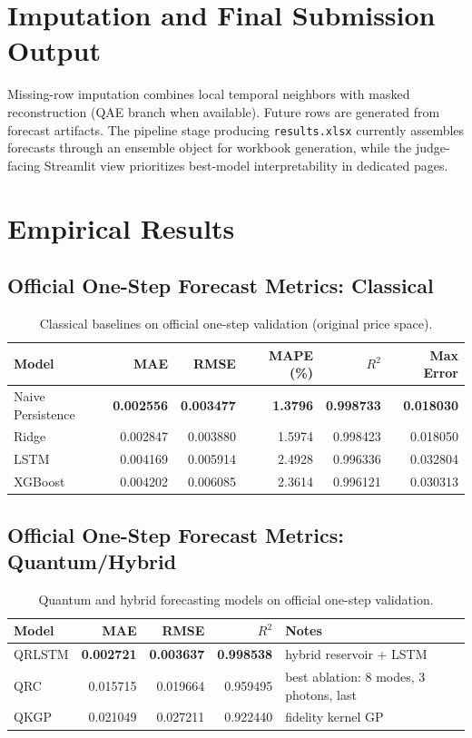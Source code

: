\documentclass[11pt]{article}
\begin{document}
\section{Imputation and Final Submission Output}
Missing-row imputation combines local temporal neighbors with masked reconstruction (QAE branch when available). Future rows are generated from forecast artifacts. The pipeline stage producing \texttt{results.xlsx} currently assembles forecasts through an ensemble object for workbook generation, while the judge-facing Streamlit view prioritizes best-model interpretability in dedicated pages.

\section{Empirical Results}
\subsection{Official One-Step Forecast Metrics: Classical}
\begin{table}[H]
\centering
\caption{Classical baselines on official one-step validation (original price space).}
\begin{tabular}{lrrrrr}
\toprule
Model & MAE & RMSE & MAPE (\%) & \(R^2\) & Max Error \\
\midrule
Naive Persistence & \textbf{0.002556} & \textbf{0.003477} & \textbf{1.3796} & \textbf{0.998733} & \textbf{0.018030} \\
Ridge & 0.002847 & 0.003880 & 1.5974 & 0.998423 & 0.018050 \\
LSTM & 0.004169 & 0.005914 & 2.4928 & 0.996336 & 0.032804 \\
XGBoost & 0.004202 & 0.006085 & 2.3614 & 0.996121 & 0.030313 \\
\bottomrule
\end{tabular}
\end{table}

\subsection{Official One-Step Forecast Metrics: Quantum/Hybrid}
\begin{table}[H]
\centering
\caption{Quantum and hybrid forecasting models on official one-step validation.}
\begin{tabular}{lrrrl}
\toprule
Model & MAE & RMSE & \(R^2\) & Notes \\
\midrule
QRLSTM & \textbf{0.002721} & \textbf{0.003637} & \textbf{0.998538} & hybrid reservoir + LSTM \\
QRC & 0.015715 & 0.019664 & 0.959495 & best ablation: 8 modes, 3 photons, last \\
QKGP & 0.021049 & 0.027211 & 0.922440 & fidelity kernel GP \\
\bottomrule
\end{tabular}
\end{table}
\end{document}
